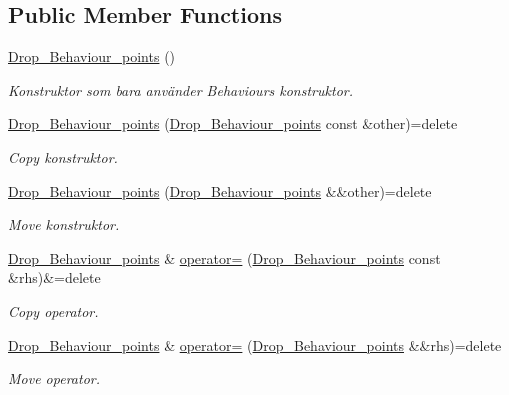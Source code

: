 \subsection*{Public Member Functions}
\begin{DoxyCompactItemize}
\item 
\hyperlink{classDrop__Behaviour__points_ae0b8b577c979496468672b00605d7793}{Drop\+\_\+\+Behaviour\+\_\+points} ()
\begin{DoxyCompactList}\small\item\em Konstruktor som bara använder Behaviours konstruktor. \end{DoxyCompactList}\item 
\hyperlink{classDrop__Behaviour__points_a17e6caa1f56c5d86db89dbfeed049b3d}{Drop\+\_\+\+Behaviour\+\_\+points} (\hyperlink{classDrop__Behaviour__points}{Drop\+\_\+\+Behaviour\+\_\+points} const \&other)=delete
\begin{DoxyCompactList}\small\item\em Copy konstruktor. \end{DoxyCompactList}\item 
\hyperlink{classDrop__Behaviour__points_a90b77f3562e551e7784eb4c11867757e}{Drop\+\_\+\+Behaviour\+\_\+points} (\hyperlink{classDrop__Behaviour__points}{Drop\+\_\+\+Behaviour\+\_\+points} \&\&other)=delete
\begin{DoxyCompactList}\small\item\em Move konstruktor. \end{DoxyCompactList}\item 
\hyperlink{classDrop__Behaviour__points}{Drop\+\_\+\+Behaviour\+\_\+points} \& \hyperlink{classDrop__Behaviour__points_a016d4fc804706e2230985db16a883d57}{operator=} (\hyperlink{classDrop__Behaviour__points}{Drop\+\_\+\+Behaviour\+\_\+points} const \&rhs)\&=delete
\begin{DoxyCompactList}\small\item\em Copy operator. \end{DoxyCompactList}\item 
\hyperlink{classDrop__Behaviour__points}{Drop\+\_\+\+Behaviour\+\_\+points} \& \hyperlink{classDrop__Behaviour__points_ac8de5ddd7d5e51b56bc133ef1068673f}{operator=} (\hyperlink{classDrop__Behaviour__points}{Drop\+\_\+\+Behaviour\+\_\+points} \&\&rhs)=delete
\begin{DoxyCompactList}\small\item\em Move operator. \end{DoxyCompactList}\item 

\end{DoxyCompactItemize}
